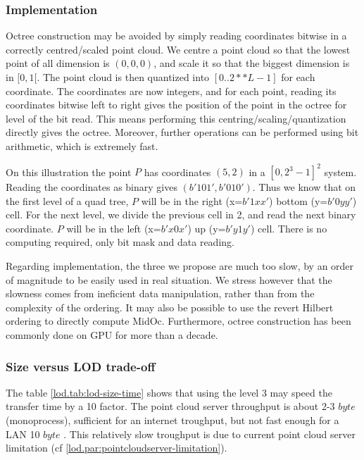 	\subsubsection{Implementation}
		\label{lod.subsubsec:bit_coordinates}
		Octree construction may be avoided by simply reading coordinates bitwise in a correctly centred/scaled point cloud.
		We centre a point cloud so that the lowest point of all dimension is $(0,0,0)$, and scale it so that the biggest dimension is in $[0,1[$.
		The point cloud is then quantized into $[0..2**L-1]$ for each coordinate.
		The coordinates are now integers, and for each point, reading its coordinates bitwise left to right gives the position of the point in the octree for level of the bit read.
		This means performing this centring/scaling/quantization directly gives the octree. Moreover, further operations can be performed using bit arithmetic, which is extremely fast.
		
		On this illustration the point $P$ has coordinates $(5,2)$ in a $[0,2^3-1]^2$ system. Reading the coordinates as binary gives $(b'101',b'010')$.
		Thus we know that on the first level of a quad tree, $P$ will be in the right (x=$b'1xx'$) bottom (y=$b'0yy'$) cell.
		For the next level, we divide the previous cell in 2, and read the next binary coordinate. $P$ will be in the left (x=$b'x0x'$) up (y=$b'y1y'$) cell. There is no computing required, only bit mask and data reading.
			
		Regarding implementation, the three we propose are much too slow, by an order of magnitude to be easily used in real situation. We stress however that the slowness comes from ineficient data manipulation, rather than from the complexity of the ordering. 
		It may also be possible to use the revert Hilbert ordering to directly compute MidOc.
		Furthermore, octree construction has been commonly done on GPU for more than a decade.
	 
	 \subsubsection{Size versus LOD trade-off}
		 \label{lod.point-cloud-server-troughput}
		 The table \ref{lod.tab:lod-size-time} shows that using the level 3 may speed the transfer time by a 10 factor.
		 The point cloud server throughput is about 2-3 \mega $byte$ \per \second  (monoprocess),  sufficient for an internet troughput, but not fast enough for a LAN 10 \mega $byte$ \per \second.
		 This relatively slow troughput is due to current point cloud server limitation (cf \ref{lod.par:pointcloudserver-limitation}).
	 
